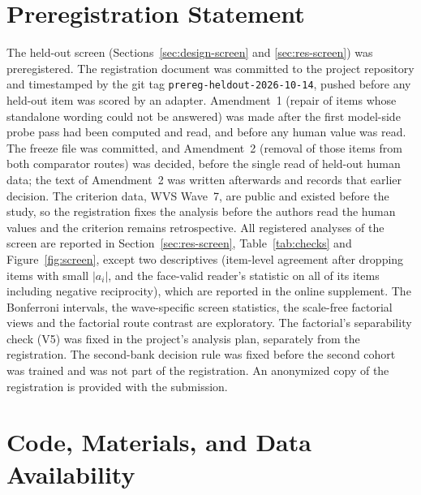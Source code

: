 \section*{Preregistration Statement}

The held-out screen (Sections~\ref{sec:design-screen} and \ref{sec:res-screen}) was preregistered. The registration document was committed to the project repository and timestamped by the git tag \texttt{prereg-heldout-2026-10-14}, pushed before any held-out item was scored by an adapter. Amendment~1 (repair of  items whose standalone wording could not be answered) was made after the first model-side probe pass had been computed and read, and before any human value was read. The freeze file was committed, and Amendment~2 (removal of those items from both comparator routes) was decided, before the single read of held-out human data; the text of Amendment~2 was written afterwards and records that earlier decision. The criterion data, WVS Wave~7, are public and existed before the study, so the registration fixes the analysis before the authors read the human values and the criterion remains retrospective. All registered analyses of the screen are reported in Section~\ref{sec:res-screen}, Table~\ref{tab:checks} and Figure~\ref{fig:screen}, except two descriptives (item-level agreement after dropping items with small $|a_i|$, and the face-valid reader's statistic on all of its items including negative reciprocity), which are reported in the online supplement.
The Bonferroni intervals, the wave-specific screen statistics, the scale-free factorial views and the factorial route contrast are exploratory. The factorial's separability check (V5) was fixed in the project's analysis plan, separately from the registration. The second-bank decision rule was fixed before the second cohort was trained and was not part of the registration. An anonymized copy of the registration is provided with the submission. %

\section*{Code, Materials, and Data Availability}

